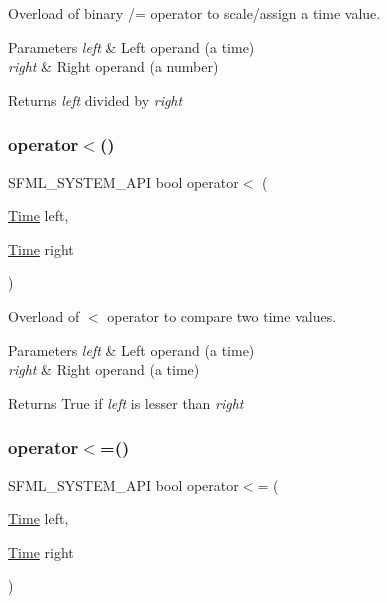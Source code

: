 Overload of binary /= operator to scale/assign a time value. 


\begin{DoxyParams}{Parameters}
{\em left} & Left operand (a time) \\
\hline
{\em right} & Right operand (a number)\\
\hline
\end{DoxyParams}
\begin{DoxyReturn}{Returns}
{\itshape left} divided by {\itshape right} 
\end{DoxyReturn}
\mbox{\label{classsf_1_1_time_ac222933174ddcff5d14c3ac7d1020d54}} 
\subsubsection{\texorpdfstring{operator$<$()}{operator<()}}
{\footnotesize\ttfamily S\+F\+M\+L\+\_\+\+S\+Y\+S\+T\+E\+M\+\_\+\+A\+PI bool operator$<$ (\begin{DoxyParamCaption}\item[{\hyperlink{classsf_1_1_time}{Time}}]{left,  }\item[{\hyperlink{classsf_1_1_time}{Time}}]{right }\end{DoxyParamCaption})\hspace{0.3cm}{\ttfamily [related]}}



Overload of $<$ operator to compare two time values. 


\begin{DoxyParams}{Parameters}
{\em left} & Left operand (a time) \\
\hline
{\em right} & Right operand (a time)\\
\hline
\end{DoxyParams}
\begin{DoxyReturn}{Returns}
True if {\itshape left} is lesser than {\itshape right} 
\end{DoxyReturn}
\mbox{\label{classsf_1_1_time_a2c22369869bf903578635bc6517c44d4}} 
\subsubsection{\texorpdfstring{operator$<$=()}{operator<=()}}
{\footnotesize\ttfamily S\+F\+M\+L\+\_\+\+S\+Y\+S\+T\+E\+M\+\_\+\+A\+PI bool operator$<$= (\begin{DoxyParamCaption}\item[{\hyperlink{classsf_1_1_time}{Time}}]{left,  }\item[{\hyperlink{classsf_1_1_time}{Time}}]{right }\end{DoxyParamCaption})\hspace{0.3cm}{\ttfamily [related]}}



